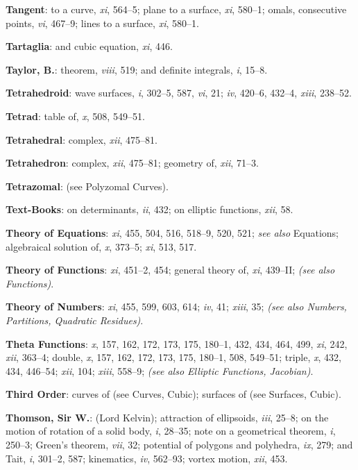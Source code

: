 \documentclass[11pt,a4paper]{article}
\newcommand{\IndexEntry}[1]{\textbf{#1}}
\newcommand{\SeeAlso}[1]{\textit{(see also #1)}}
\newcommand{\V}[1]{\textit{#1}} %
\begin{document}
\IndexEntry{Tangent}: to a curve, \V{xi}, 564--5; plane to a surface, \V{xi}, 580--1; omals, consecutive points, \V{vi}, 467--9; lines to a surface, \V{xi}, 580--1.

\IndexEntry{Tartaglia}: and cubic equation, \V{xi}, 446.

\IndexEntry{Taylor, B.}: theorem, \V{viii}, 519; and definite integrals, \V{i}, 15--8.

\IndexEntry{Tetrahedroid}: wave surfaces, \V{i}, 302--5, 587, \V{vi}, 21; \V{iv}, 420--6, 432--4, \V{xiii}, 238--52.

\IndexEntry{Tetrad}: table of, \V{x}, 508, 549--51.

\IndexEntry{Tetrahedral}: complex, \V{xii}, 475--81.

\IndexEntry{Tetrahedron}: complex, \V{xii}, 475--81; geometry of, \V{xii}, 71--3.

\newpage

\setcounter{page}{127}

\IndexEntry{Tetrazomal}: (see Polyzomal Curves).

\IndexEntry{Text-Books}: on determinants, \V{ii}, 432; on elliptic functions, \V{xii}, 58.

\IndexEntry{Theory of Equations}: \V{xi}, 455, 504, 516, 518--9, 520, 521; \textit{see also} Equations; algebraical solution of, \V{x}, 373--5; \V{xi}, 513, 517.

\IndexEntry{Theory of Functions}: \V{xi}, 451--2, 454; general theory of, \V{xi}, 439--II; \SeeAlso{Functions}.

\IndexEntry{Theory of Numbers}: \V{xi}, 455, 599, 603, 614; \V{iv}, 41; \V{xiii}, 35; \SeeAlso{Numbers, Partitions, Quadratic Residues}.

\IndexEntry{Theta Functions}: \V{x}, 157, 162, 172, 173, 175, 180--1, 432, 434, 464, 499, \V{xi}, 242, \V{xii}, 363--4; double, \V{x}, 157, 162, 172, 173, 175, 180--1, 508, 549--51; triple, \V{x}, 432, 434, 446--54; \V{xii}, 104; \V{xiii}, 558--9; \SeeAlso{Elliptic Functions, Jacobian}.

\IndexEntry{Third Order}: curves of (see Curves, Cubic); surfaces of (see Surfaces, Cubic).

\IndexEntry{Thomson, Sir W.}: (Lord Kelvin); attraction of ellipsoids, \V{iii}, 25--8; on the motion of rotation of a solid body, \V{i}, 28--35; note on a geometrical theorem, \V{i}, 250--3; Green's theorem, \V{vii}, 32; potential of polygons and polyhedra, \V{ix}, 279; and Tait, \V{i}, 301--2, 587; kinematics, \V{iv}, 562--93; vortex motion, \V{xii}, 453.
\end{document}
